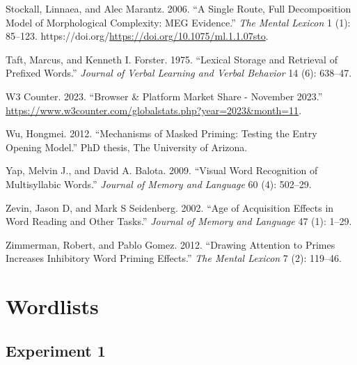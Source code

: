 \documentclass[
]{interact}
\newlength{\cslhangindent}
\newenvironment{CSLReferences}[2] %
 {\begin{list}{}{%
  \setlength{\itemindent}{0pt}
  \setlength{\leftmargin}{0pt}
  \setlength{\parsep}{0pt}
  \ifodd #1
   \setlength{\leftmargin}{\cslhangindent}
   \setlength{\itemindent}{-1\cslhangindent}
  \fi
  \setlength{\itemsep}{#2\baselineskip}}}
 {\end{list}}
\begin{document}
\begin{CSLReferences}{1}{0}
Stockall, Linnaea, and Alec Marantz. 2006. {``A Single Route, Full
Decomposition Model of Morphological Complexity: MEG Evidence.''}
\emph{The Mental Lexicon} 1 (1): 85--123.
https://doi.org/\url{https://doi.org/10.1075/ml.1.1.07sto}.

Taft, Marcus, and Kenneth I. Forster. 1975. {``Lexical Storage and
Retrieval of Prefixed Words.''} \emph{Journal of Verbal Learning and
Verbal Behavior} 14 (6): 638--47.

W3 Counter. 2023. {``Browser \& Platform Market Share - November
2023.''}
\url{https://www.w3counter.com/globalstats.php?year=2023&month=11}.

Wu, Hongmei. 2012. {``Mechanisms of Masked Priming: Testing the Entry
Opening Model.''} PhD thesis, The University of Arizona.

Yap, Melvin J., and David A. Balota. 2009. {``Visual Word Recognition of
Multisyllabic Words.''} \emph{Journal of Memory and Language} 60 (4):
502--29.

Zevin, Jason D, and Mark S Seidenberg. 2002. {``Age of Acquisition
Effects in Word Reading and Other Tasks.''} \emph{Journal of Memory and
Language} 47 (1): 1--29.

Zimmerman, Robert, and Pablo Gomez. 2012. {``Drawing Attention to Primes
Increases Inhibitory Word Priming Effects.''} \emph{The Mental Lexicon}
7 (2): 119--46.

\end{CSLReferences}

\newpage{}

\section*{Wordlists}\label{wordlists}

\subsection*{Experiment 1}\label{experiment-1}
\end{document}
